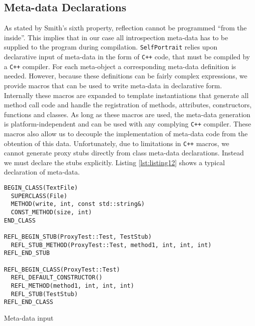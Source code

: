 \subsection{Meta-data Declarations}

As stated by Smith's \cite{Smith} sixth property, reflection cannot be programmed ``from the inside''. This implies that
in our case all introspection meta-data has to be supplied to the program during compilation. \texttt{SelfPortrait}
relies upon declarative input of meta-data in the form of \texttt{C++} code, that must be compiled by a \texttt{C++} compiler.
For each meta-object a corresponding meta-data definition is needed. However, because these definitions can be fairly
complex expressions, we provide macros that can be used to write meta-data in declarative form.
Internally these macros are expanded to template instantiations that generate all method
call code and handle the registration of methods, attributes, constructors, functions and classes. As long
as these macros are used, the meta-data generation is platform-independent and can be used with any complying
\texttt{C++} compiler. These macros also allow us to decouple the implementation of meta-data code from the obtention
of this data. Unfortunately, due to limitations in \texttt{C++} macros, we cannot generate proxy stubs directly from class 
meta-data declarations. Instead we must declare the stubs explicitly. Listing \ref{lst:listing12} shows a typical
declaration of meta-data.

\begin{listing}[H]
\begin{verbatim}
BEGIN_CLASS(TextFile)
  SUPERCLASS(File)
  METHOD(write, int, const std::string&)
  CONST_METHOD(size, int)
END_CLASS

REFL_BEGIN_STUB(ProxyTest::Test, TestStub)
  REFL_STUB_METHOD(ProxyTest::Test, method1, int, int, int)
REFL_END_STUB

REFL_BEGIN_CLASS(ProxyTest::Test)
  REFL_DEFAULT_CONSTRUCTOR()
  REFL_METHOD(method1, int, int, int)
  REFL_STUB(TestStub)
REFL_END_CLASS
\end{verbatim}
\caption{Meta-data input}
\label{lst:listing12}
\end{listing}

